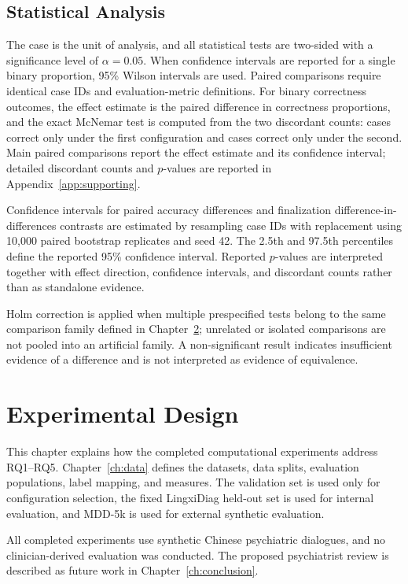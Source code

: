 \documentclass[12pt,a4paper,oneside]{report}
\begin{document}
\section{Statistical Analysis}

The case is the unit of analysis, and all statistical tests are two-sided with a significance level of $\alpha=0.05$. When confidence intervals are reported for a single binary proportion, 95\% Wilson intervals are used. Paired comparisons require identical case IDs and evaluation-metric definitions. For binary correctness outcomes, the effect estimate is the paired difference in correctness proportions, and the exact McNemar test is computed from the two discordant counts: cases correct only under the first configuration and cases correct only under the second. Main paired comparisons report the effect estimate and its confidence interval; detailed discordant counts and $p$-values are reported in Appendix~\ref{app:supporting}.

Confidence intervals for paired accuracy differences and finalization difference-in-differences contrasts are estimated by resampling case IDs with replacement using 10,000 paired bootstrap replicates and seed 42. The 2.5th and 97.5th percentiles define the reported 95\% confidence interval. Reported $p$-values are interpreted together with effect direction, confidence intervals, and discordant counts rather than as standalone evidence.

Holm correction is applied when multiple prespecified tests belong to the same comparison family defined in Chapter~\ref{ch:experimental}; unrelated or isolated comparisons are not pooled into an artificial family. A non-significant result indicates insufficient evidence of a difference and is not interpreted as evidence of equivalence.

\chapter{Experimental Design}
\label{ch:experimental}

This chapter explains how the completed computational experiments address
RQ1--RQ5. Chapter~\ref{ch:data} defines the datasets, data splits,
evaluation populations, label mapping, and measures. The validation set
is used only for configuration selection, the fixed LingxiDiag held-out
set is used for internal evaluation, and MDD-5k is used for external
synthetic evaluation.

All completed experiments use synthetic Chinese psychiatric dialogues,
and no clinician-derived evaluation was conducted. The proposed
psychiatrist review is described as future work in
Chapter~\ref{ch:conclusion}.
\end{document}
